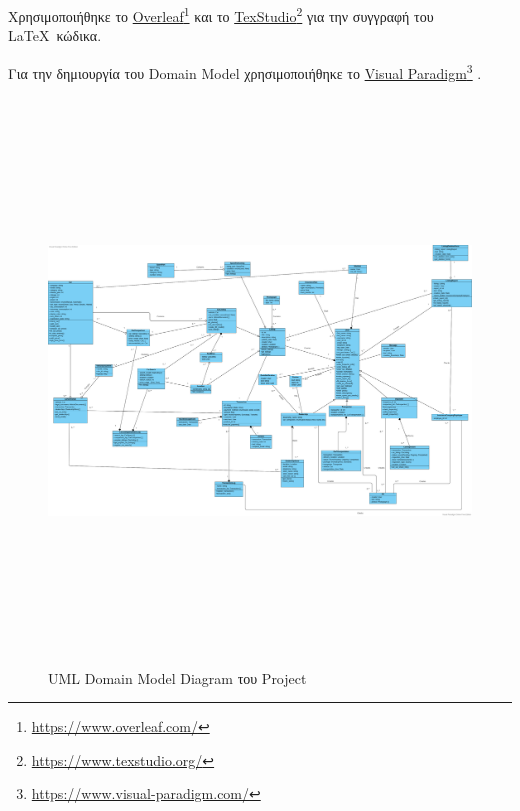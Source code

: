 \documentclass{../ol-softwaremanual}
\newcommand{\doclink}[2]{\href{#1}{#2}\footnote{\url{#1}}}
\begin{document}
	
	\newpage 
	
	
	
	\vspace{20pt}
	\flushleft
	Χρησιμοποιήθηκε το \en \doclink{https://www.overleaf.com/}{Overleaf} \gr και το \en \doclink{https://www.texstudio.org/}{TexStudio} \gr για την συγγραφή του \LaTeX\ κώδικα. \break
	
	Για την δημιουργία του \en Domain Model \gr χρησιμοποιήθηκε το \en \doclink{https://www.visual-paradigm.com/}{Visual Paradigm} \gr .
	
	\newpage
	
	
	\begin{figure}[htbp!]		
		\includegraphics[width=\textwidth+3.45cm, height=15cm]{img/Domain_model.png}
		\caption{\en UML Domain Model Diagram \gr του \en Project \gr}
	\end{figure}
	
	
	
	\newpage
	
	
\end{document}
